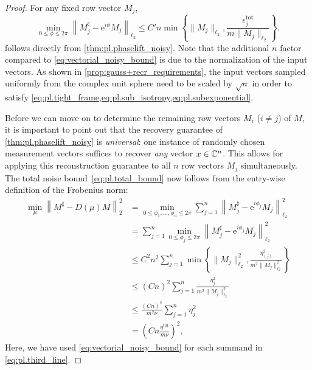 \begin{proof}
  For any fixed row vector ${M}_j$,
  \[
    \min_{0 \leq \phi \leq 2 \pi}\left\| {M}_j^\sharp - \mathrm{e}^{i \phi} {M}_j \right\|_{\ell_2} \leq C' n \min
    \left\{
    \| {M}_j \|_{\ell_2}, \frac{ \epsilon_j^{\mathrm{tot}}}{m \| {M}_j \|_{\ell_2}}
    \right\}.
    \label{eq:noisy_reconstruction_vectorial_bound}
  \]
  follows directly from \cref{thm:pl.phaselift_noisy}.
  Note that the additional $n$ factor compared to \cref{eq:vectorial_noisy_bound} is due to the normalization of the input vectors.
  As shown in \cref{prop:gauss+recr_requirements}, the input vectors sampled uniformly from the complex unit sphere need to be scaled by $\sqrt{n}$ in order to satisfy \cref{eq:pl.tight_frame,eq:pl.sub_isotropy,eq:pl.subexponential}.

  Before we can move on to determine the remaining row vectors ${M}_{i}$ ($i \neq j$) of ${M}$, it is important to point out that the recovery guarantee of \cref{thm:pl.phaselift_noisy} is \emph{universal}: one instance of randomly chosen measurement vectors suffices to recover \emph{any} vector ${x} \in {\mathbb{C}}^n$.
  This allows for applying this reconstruction guarantee to all $n$ row vectors ${M}_j$ simultaneously.
  The total noise bound~\eqref{eq:pl.total_bound} now follows from the entry-wise definition of the Frobenius norm:
  \begin{align}
    \min_{{\mu}}\left\|  {M}^\sharp -  {D} ({\mu}) {M} \right\|_2 ^2
    &= \min_{0 \leq \phi_1,\ldots,\phi_n \leq 2 \pi}
    \sum_{j=1}^n \left\| {M}_j^\sharp - \mathrm{e}^{i \phi_j} {M}_j \right\|_{\ell_2}^2 \\
    &= \sum_{j=1}^n \min_{0 \leq \phi_j \leq 2 \pi} \left\| {M}_j^\sharp - \mathrm{e}^{i \phi_j} {M}_j \right\|_{\ell_2}^2 \\
    \label{eq:pl.third_line}
    & \leq C^2 n^2 \sum_{j=1}^n  \min \left\{ \| {M}_j \|_{\ell_2}^2, \frac{ \eta_{(j)}^2}{m^2 \|{M}_j \|_{\ell_2}^2} \right\} \\
    &\leq \left(C n\right)^2 \sum_{j=1}^n \frac{\eta_{j}^2}{m^2 \|{M}_j \|_{\ell_2}^2} \\
    & \leq \frac{\left(Cn \right)^2}{m^2 \nu} \sum_{j=1}^n \eta_{j}^2 \\
    &= \left( C n \frac{\eta^{\mathrm{tot}}}{m \nu} \right)^2,
  \end{align}
  Here, we have used \cref{eq:vectorial_noisy_bound} for each summand in \cref{eq:pl.third_line}.
\end{proof}


